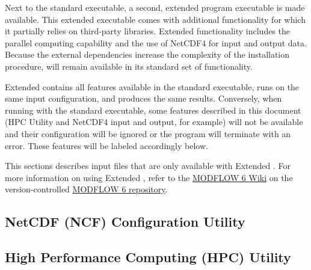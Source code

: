 Next to the standard \mf executable, a second, extended program executable is made available. This extended executable comes with additional functionality for which it partially relies on third-party libraries. Extended functionality includes the parallel computing capability and the use of NetCDF4 for input and output data. Because the external dependencies increase the complexity of the installation procedure, \mf will remain available in its standard set of functionality.

Extended \mf contains all features available in the standard executable, runs on the same input configuration, and produces the same results. Conversely, when running with the standard executable, some features described in this document (HPC Utility and NetCDF4 input and output, for example) will not be available and their configuration will be ignored or the program will terminate with an error. These features will be labeled accordingly below.

This sections describes input files that are only available with Extended \mf.  For more information on using Extended \mf, refer to the \href{https://github.com/MODFLOW-USGS/modflow6/wiki}{MODFLOW 6 Wiki} on the version-controlled \href{https://github.com/MODFLOW-USGS/modflow6}{MODFLOW 6 repository}.

\newpage
\subsection{NetCDF (NCF) Configuration Utility}


\newpage
\subsection{High Performance Computing (HPC) Utility}


